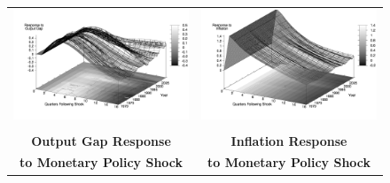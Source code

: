 \documentclass[10pt]{article}
\begin{document}
{\begin{figure}
\begin{tabular}{cc}
\includegraphics[scale=0.12]{images/Irf16_Output_Gap_Cost_Shock.png} & \includegraphics[scale=0.12]{images/Irf16_Inflation_Cost_Shock.png} \\\\
\textbf{Output Gap Response} & \textbf{Inflation Response} \\
\textbf{to Monetary Policy Shock} & \textbf{to Monetary Policy Shock}  \\

\end{tabular}
\end{figure}}
\end{document}
